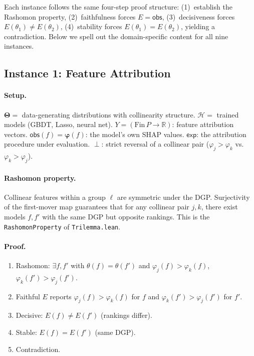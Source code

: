 \documentclass[11pt,a4paper]{article}
\newcommand{\R}{\mathbb{R}}
\newcommand{\Params}{\mathbf{\Theta}}
\newcommand{\sH}{\mathcal{H}}
\newcommand{\incomp}{\perp}
\begin{document}
Each instance follows the same four-step proof structure: (1)~establish the
Rashomon property, (2)~faithfulness forces $E = \mathsf{obs}$,
(3)~decisiveness forces $E(\theta_1) \neq E(\theta_2)$,
(4)~stability forces $E(\theta_1) = E(\theta_2)$, yielding a contradiction.
Below we spell out the domain-specific content for all nine instances.

\subsection{Instance 1: Feature Attribution}
\label{app:proof-attribution}

\paragraph{Setup.}
$\Params ={}$ data-generating distributions with collinearity structure.
$\sH ={}$ trained models (GBDT, Lasso, neural net).
$Y = (\mathrm{Fin}\,P \to \R)$: feature attribution vectors.
$\mathsf{obs}(f) = \boldsymbol{\varphi}(f)$: the model's own SHAP values.
$\mathsf{exp}$: the attribution procedure under evaluation.
$\incomp$: strict reversal of a collinear pair ($\varphi_j > \varphi_k$ vs.\
$\varphi_k > \varphi_j$).

\paragraph{Rashomon property.}
Collinear features within a group $\ell$ are symmetric under the DGP.
Surjectivity of the first-mover map guarantees that for any collinear pair
$j, k$, there exist models $f, f'$ with the same DGP but opposite rankings.
This is the \texttt{RashomonProperty} of \texttt{Trilemma.lean}.

\paragraph{Proof.}
\begin{enumerate}[nosep]
  \item Rashomon: $\exists f, f'$ with $\theta(f) = \theta(f')$ and
    $\varphi_j(f) > \varphi_k(f)$, $\varphi_k(f') > \varphi_j(f')$.
  \item Faithful $E$ reports $\varphi_j(f) > \varphi_k(f)$ for $f$ and
    $\varphi_k(f') > \varphi_j(f')$ for $f'$.
  \item Decisive: $E(f) \neq E(f')$ (rankings differ).
  \item Stable: $E(f) = E(f')$ (same DGP).
  \item Contradiction.
\end{enumerate}
\end{document}
